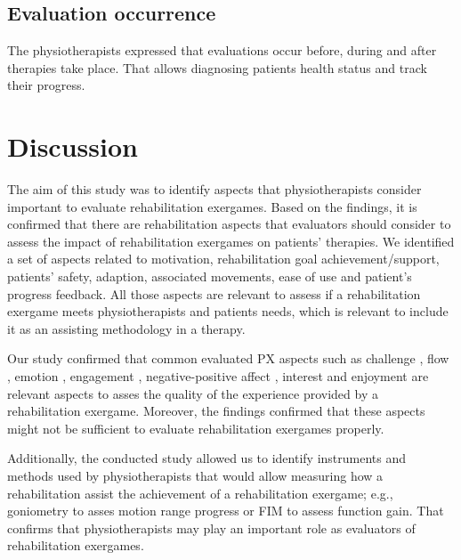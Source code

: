 \subsection{Evaluation occurrence}
The physiotherapists expressed that evaluations occur before, during and after therapies take place. That allows diagnosing patients health status and track their progress. 

\section{Discussion} %
\label{sec:discussion_aspects}

The aim of this study was to identify aspects that physiotherapists consider important to evaluate rehabilitation exergames. Based on the findings, it is confirmed that there are rehabilitation aspects that evaluators should consider to assess the impact of rehabilitation exergames on patients' therapies. We identified a set of aspects related to motivation, rehabilitation goal achievement/support, patients' safety, adaption, associated movements, ease of use and patient's progress feedback. All those aspects are relevant to assess if a rehabilitation exergame meets physiotherapists and patients needs, which is relevant to include it as an assisting methodology in a therapy.

Our study confirmed that common evaluated \ac{PX} aspects such as challenge \autocite{Moosajee,Nacke2009,VandenAbeele2016,Wiemeyer2016,Desurvire2009}, flow \autocite{Sinclair2007,Lapas2015,Bernhaupt2015,Nacke2009,Wiemeyer2016,Nijholt2008}, emotion \autocite{Bernhaupt2015,Sanchez2009,Wiemeyer2016}, engagement \autocite{Yanez-Gomez2017,Wiemeyer2016}, negative-positive affect \autocite{Nacke2009}, interest \autocite{VandenAbeele2016} and enjoyment \autocite{Ho2017,Li2016,VandenAbeele2016,Zhao2016,Li2006,Berkovsky2010} are relevant aspects to asses the quality of the experience provided by a rehabilitation exergame. Moreover, the findings confirmed that these aspects might not be sufficient to evaluate rehabilitation exergames properly.

Additionally, the conducted study allowed us to identify instruments and methods used by physiotherapists that would allow measuring how a rehabilitation assist the achievement of a rehabilitation exergame; e.g., goniometry to asses motion range progress or \ac{FIM} to assess function gain. That confirms that physiotherapists may play an important role as evaluators of rehabilitation exergames.

